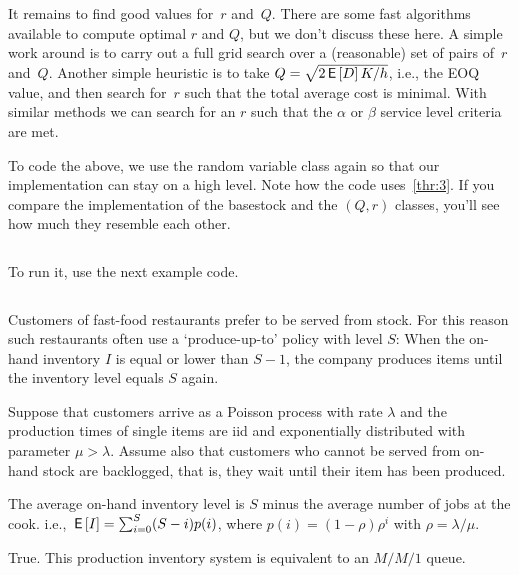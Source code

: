 \documentclass[stochastic-or.tex]{subfiles}
\begin{document}
It remains to find good values for~$r$ and~$Q$.
There are some fast algorithms available to compute optimal $r$ and $Q$, but  we don't discuss these here.
A simple work around is to carry out a full grid search over a (reasonable) set of pairs of~$r$ and~$Q$.
Another simple heuristic is to take $Q=\sqrt{2\,\mathsf{E}\left[D\right]K/h}$, i.e., the EOQ value, and then search for~$r$ such that the total average cost is minimal.
With similar methods we can search for an $r$ such that the $\alpha$ or $\beta$ service level criteria are met.

To code the above, we use the random variable class again so that our  implementation can stay on a high level. Note how the code uses~\cref{thr:3}.
If you compare the implementation of the basestock and the $(Q,r)$ classes, you'll see how much they resemble each other.
\inputminted[firstline=78, lastline=114]{python}{../code/lighthouse.py} %
To run it, use the next example code.
\inputminted[firstline=121, lastline=124]{python}{../code/lighthouse.py} %


\begin{truefalse}
Customers of fast-food restaurants prefer to be served from stock.
For this reason such restaurants often use a `produce-up-to' policy with level $S$: When the on-hand inventory $I$ is equal or lower than $S-1$, the company produces items until the inventory level equals $S$ again.

Suppose that customers arrive as a Poisson process with rate $\lambda$ and the production times of single items are iid and exponentially distributed with parameter $\mu> \lambda$.
Assume also that customers who cannot be served from on-hand stock are backlogged, that is, they wait until their item has been produced.

The average on-hand inventory level is $S$ minus the average number of jobs at the cook. i.e., $\,\mathsf{E}\left[I\right] = \sum_{i=0}^{S} (S-i) p(i)$, where $p(i) = (1-\rho)\rho^{i}$ with $\rho = \lambda/\mu$.
\begin{solution}
True. This production inventory system is equivalent to an $M/M/1$ queue.
\end{solution}
\end{truefalse}
\end{document}
